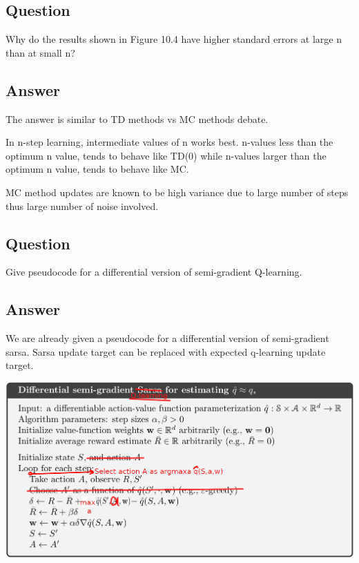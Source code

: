 \documentclass[11pt]{article}
\begin{document}
    \subsection{Question}

    Why do the results shown in Figure 10.4 have higher standard errors at large n than at small n?

    \subsection*{Answer}

    The answer is similar to TD methods vs MC methods debate.

    In n-step learning, intermediate values of n works best.
    n-values less than the optimum n value, tends to behave like TD(0) while n-values larger than the optimum n value, tends to behave like MC.

    MC method updates are known to be high variance due to large number of steps thus large number of noise involved.

   \subsection{Question}

    Give pseudocode for a differential version of semi-gradient Q-learning.

    \subsection*{Answer}

    We are already given a pseudocode for a differential version of semi-gradient sarsa.
    Sarsa update target can be replaced with expected q-learning update target.

    \includegraphics[scale=0.7]{exercise_10_4}
\end{document}
